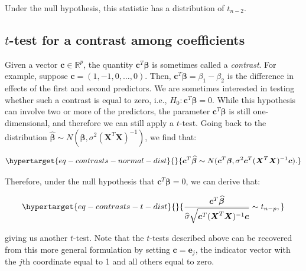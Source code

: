 \documentclass[
  11pt,
  letterpaper,
  oneside]{book}
\theoremstyle{plain}
\theoremstyle{plain}
\theoremstyle{definition}
\theoremstyle{definition}
\theoremstyle{plain}
\theoremstyle{remark}
\begin{document}
Under the null hypothesis, this statistic has a distribution of
\(t_{n-2}\).

\hypertarget{t-test-for-a-contrast-among-coefficients}{%
\subsection{\texorpdfstring{\(t\)-test for a contrast among
coefficients}{t-test for a contrast among coefficients}}\label{t-test-for-a-contrast-among-coefficients}}

Given a vector \(\boldsymbol{c} \in \mathbb{R}^p\), the quantity
\(\boldsymbol{c}^T \boldsymbol{\beta}\) is sometimes called a
\emph{contrast}. For example, suppose
\(\boldsymbol{c} = (1,-1, 0, \dots, 0)\). Then,
\(\boldsymbol{c}^T \boldsymbol{\beta} = \beta_1 - \beta_2\) is the
difference in effects of the first and second predictors. We are
sometimes interested in testing whether such a contrast is equal to
zero, i.e., \(H_0: \boldsymbol{c}^T \boldsymbol{\beta} = 0\). While this
hypothesis can involve two or more of the predictors, the parameter
\(\boldsymbol{c}^T \boldsymbol{\beta}\) is still one-dimensional, and
therefore we can still apply a \(t\)-test. Going back to the
distribution
\(\boldsymbol{\widehat{\beta}} \sim N(\boldsymbol{\beta}, \sigma^2(\boldsymbol{X}^T \boldsymbol{X})^{-1})\),
we find that:

\begin{equation}\protect\hypertarget{eq-contrasts-normal-dist}{}{
\boldsymbol{c}^T\boldsymbol{\widehat{\beta}} \sim N(\boldsymbol{c}^T\boldsymbol{\beta}, \sigma^2\boldsymbol{c}^T (\boldsymbol{X}^T \boldsymbol{X})^{-1} \boldsymbol{c}).
}\label{eq-contrasts-normal-dist}\end{equation}

Therefore, under the null hypothesis that
\(\boldsymbol{c}^T \boldsymbol{\beta} = 0\), we can derive that:

\begin{equation}\protect\hypertarget{eq-contrasts-t-dist}{}{
\frac{\boldsymbol{c}^T \boldsymbol{\widehat{\beta}}}{\widehat{\sigma} \sqrt{\boldsymbol{c}^T (\boldsymbol{X}^T \boldsymbol{X})^{-1} \boldsymbol{c}}} \sim t_{n-p},
}\label{eq-contrasts-t-dist}\end{equation}

giving us another \(t\)-test. Note that the \(t\)-tests described above
can be recovered from this more general formulation by setting
\(\boldsymbol{c} = \boldsymbol{e}_j\), the indicator vector with the
\(j\)th coordinate equal to 1 and all others equal to zero.
\end{document}
